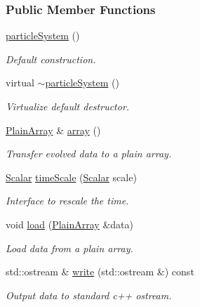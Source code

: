 \subsubsection*{Public Member Functions}
\begin{DoxyCompactItemize}
\item 
\mbox{\hyperlink{classparticle_system_a6fcdf55bb3999bde562ef2ba22693c6d}{particle\+System}} ()
\begin{DoxyCompactList}\small\item\em Default construction. \end{DoxyCompactList}\item 
virtual \mbox{\hyperlink{classparticle_system_a14ddda3c186e335eb989790db240dd94}{$\sim$particle\+System}} ()
\begin{DoxyCompactList}\small\item\em Virtualize default destructor. \end{DoxyCompactList}\item 
\mbox{\hyperlink{classparticle_system_ae5a7215810a9f2cad5508aca6b26a063}{Plain\+Array}} \& \mbox{\hyperlink{classparticle_system_a1817956f802188c82c12c223c32bd28a}{array}} ()
\begin{DoxyCompactList}\small\item\em Transfer evolved data to a plain array. \end{DoxyCompactList}\item 
\mbox{\hyperlink{classparticle_system_a28e49da72c0ca5786d0611e6128a8994}{Scalar}} \mbox{\hyperlink{classparticle_system_a973f0cdc8c8ab21c65e57b8729207551}{time\+Scale}} (\mbox{\hyperlink{classparticle_system_a28e49da72c0ca5786d0611e6128a8994}{Scalar}} scale)
\begin{DoxyCompactList}\small\item\em Interface to rescale the time. \end{DoxyCompactList}\item 
void \mbox{\hyperlink{classparticle_system_a73609eb9d95e01724f9f56cb0d9f7ac7}{load}} (\mbox{\hyperlink{classparticle_system_ae5a7215810a9f2cad5508aca6b26a063}{Plain\+Array}} \&data)
\begin{DoxyCompactList}\small\item\em Load data from a plain array. \end{DoxyCompactList}\item 
std\+::ostream \& \mbox{\hyperlink{classparticle_system_a7f37791caaafd35f6c2d7afcc2a49b34}{write}} (std\+::ostream \&) const
\begin{DoxyCompactList}\small\item\em Output data to standard c++ ostream. \end{DoxyCompactList}\item 

\end{DoxyCompactItemize}
